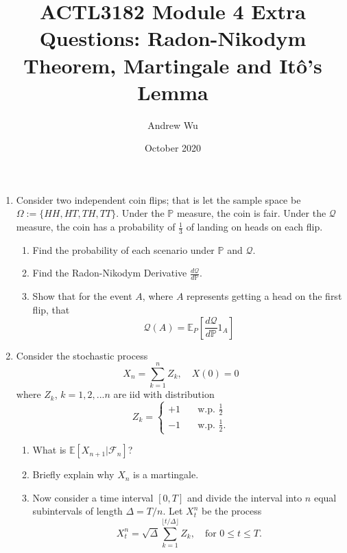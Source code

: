 \documentclass[11pt]{article}
\title{\textbf{ACTL3182 Module 4 Extra Questions: Radon-Nikodym Theorem, Martingale and It\^o's Lemma}}
\author{Andrew Wu}
\date{October 2020}
\newcommand{\E}{\mathbb{E}}
\newcommand{\PR}{\mathbb{P}}
\newcommand{\Q}{\mathcal{Q}}
\begin{document}
	\maketitle
	\begin{enumerate}
		\item Consider two independent coin flips; that is let the sample space be $\Omega:=\{HH, HT, TH, TT\}$. Under the $\PR$ measure, the coin is fair. Under the $\Q$ measure, the coin has a probability of $\frac{1}{3}$ of landing on heads on each flip. 
		\begin{enumerate}
			\item Find the probability of each scenario under $\PR$ and $\Q$.
			\item Find the Radon-Nikodym Derivative $\frac{d\Q}{d\PR}$.
			\item Show that for the event $A$, where $A$ represents getting a head on the first flip, that
			\[	\Q(A) = \E_{P}\left[\frac{d\Q}{d\PR}1_{A}\right]
			\]
		\end{enumerate}
		\item Consider the stochastic process 
		\[	X_n = \sum_{k=1}^{n}Z_{k},\quad X(0) = 0
		\]
		where $Z_{k}$, $k=1,2,...n$ are iid with distribution 
		\[	Z_{k} = \begin{cases}
			+1 &  \quad \text{w.p. } \frac{1}{2} \\
			-1 & \quad \text{w.p. } \frac{1}{2}.
		\end{cases}
		\]
		\begin{enumerate}
			\item What is $\E[X_{n+1}|\mathcal{F}_{n}]$?
			\item Briefly explain why $X_n$ is a martingale.
			\item Now consider a time interval $[0, T]$ and divide the interval into $n$ equal subintervals of length $\Delta = T/n$. Let $X_t^{n}$ be the process
			\[	X_t^{n} = \sqrt{\Delta}\sum_{k=1}^{\lfloor t/\Delta \rfloor}Z_{k}, \quad \text{for } 0\leq t\leq T. 
			\]
			

\end{enumerate}
\end{enumerate}
\end{document}
